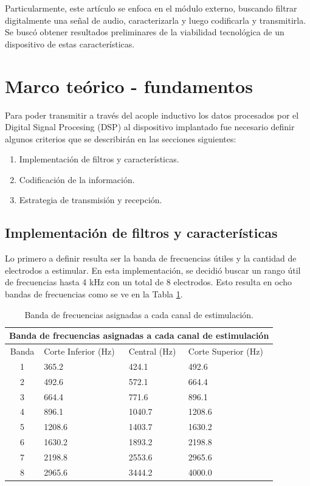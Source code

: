 \documentclass[conference]{IEEEtran}
\begin{document}
Particularmente, este artículo se enfoca en el módulo externo, buscando filtrar digitalmente una señal de audio, caracterizarla y luego codificarla y transmitirla. Se buscó obtener resultados preliminares de la viabilidad tecnológica de un dispositivo de estas características.

\section{Marco teórico - fundamentos}

Para poder transmitir a través del acople inductivo los datos procesados por el Digital Signal Procesing (DSP) al dispositivo implantado fue necesario definir algunos criterios que se describirán en las secciones siguientes:

\begin{enumerate}
    \item Implementación de filtros y características.
    \item Codificación de la información.
    \item Estrategia de transmisión y recepción.
\end{enumerate}

\subsection{Implementación de filtros y características}

Lo primero a definir resulta ser la banda de frecuencias útiles y la cantidad de electrodos a estimular. En esta implementación, se decidió buscar un rango útil de frecuencias hasta 4 kHz con un total de 8 electrodos. Esto resulta en ocho bandas de frecuencias como se ve en la Tabla \ref{table:freq_bands}.

\begin{table}[h!]
\centering
\caption{Banda de frecuencias asignadas a cada canal de estimulación.}
\label{table:freq_bands}
\begin{tabularx}{\columnwidth}{|c|X|X|X|}
    \hline
    \multicolumn{4}{|c|}{Banda de frecuencias asignadas a cada canal de estimulación} \\
    \hline
    Banda & Corte Inferior (Hz) & Central (Hz) & Corte Superior (Hz) \\
    \hline
    1 & 365.2 & 424.1 & 492.6 \\
    2 & 492.6 & 572.1 & 664.4 \\
    3 & 664.4 & 771.6 & 896.1 \\
    4 & 896.1 & 1040.7 & 1208.6 \\
    5 & 1208.6 & 1403.7 & 1630.2 \\
    6 & 1630.2 & 1893.2 & 2198.8 \\
    7 & 2198.8 & 2553.6 & 2965.6 \\
    8 & 2965.6 & 3444.2 & 4000.0 \\
    \hline
\end{tabularx}
\end{table}
\end{document}
